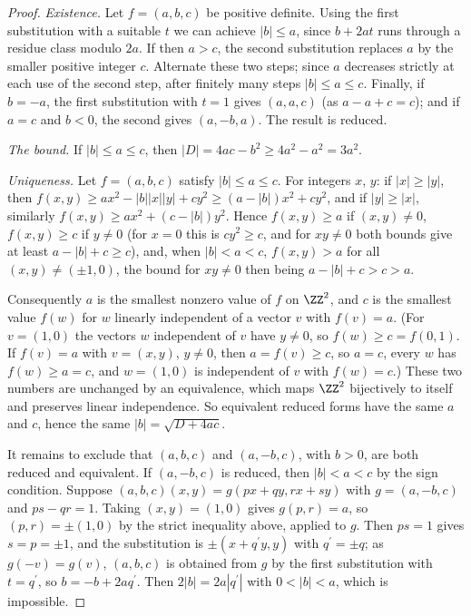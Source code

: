 \begin{proof}
\emph{Existence.} Let $f = (a, b, c)$ be positive definite. Using the first substitution with a suitable $t$ we can achieve $|b| \leq a$, since $b + 2at$ runs through a residue class modulo $2a$. If
then $a > c$, the second substitution replaces $a$ by the smaller positive integer $c$. Alternate these two steps; since $a$ decreases strictly at each use of the second step, after finitely many steps
$|b| \leq a \leq c$. Finally, if $b = -a$, the first substitution with $t = 1$ gives $(a, a, c)$ (as $a - a + c = c$); and if $a = c$ and $b < 0$, the second gives $(a, -b, a)$. The result is reduced.

\emph{The bound.} If $|b| \leq a \leq c$, then $|D| = 4ac - b^2 \geq 4a^2 - a^2 = 3a^2$.

\emph{Uniqueness.} Let $f = (a, b, c)$ satisfy $|b| \leq a \leq c$. For integers $x$, $y$: if $|x| \geq |y|$, then
$f(x, y) \geq ax^2 - |b||x||y| + cy^2 \geq (a - |b|)x^2 + cy^2$, and if $|y| \geq |x|$, similarly $f(x, y) \geq ax^2 + (c - |b|)y^2$. Hence $f(x, y) \geq a$ if $(x, y) \neq 0$, $f(x, y) \geq c$ if $y \neq 0$
(for $x = 0$ this is $cy^2 \geq c$, and for $xy \neq 0$ both bounds give at least $a - |b| + c \geq c$), and, when $|b| < a < c$, $f(x, y) > a$ for all $(x, y) \neq (\pm1, 0)$, the bound for $xy \neq 0$ then
being $a - |b| + c > c > a$.

Consequently $a$ is the smallest nonzero value of $f$ on $\ZZ^2$, and $c$ is the smallest value $f(w)$ for $w$ linearly independent of a vector $v$ with $f(v) = a$. (For $v = (1, 0)$ the vectors $w$ independent
of $v$ have $y \neq 0$, so $f(w) \geq c = f(0, 1)$. If $f(v) = a$ with $v = (x, y)$, $y \neq 0$, then $a = f(v) \geq c$, so $a = c$, every $w$ has $f(w) \geq a = c$, and $w = (1, 0)$ is independent of $v$ with $f(w) = c$.) These two numbers are unchanged by an
equivalence, which maps $\ZZ^2$ bijectively to itself and preserves linear independence. So equivalent reduced forms have the same $a$ and $c$, hence the same $|b| = \sqrt{D + 4ac}$.

It remains to exclude that $(a, b, c)$ and $(a, -b, c)$, with $b > 0$, are both reduced and equivalent. If $(a, -b, c)$ is reduced, then $|b| < a < c$ by the sign condition. Suppose
$(a, b, c)(x, y) = g(px + qy, rx + sy)$ with $g = (a, -b, c)$ and $ps - qr = 1$. Taking $(x, y) = (1, 0)$ gives $g(p, r) = a$, so $(p, r) = \pm(1, 0)$ by the strict inequality above, applied to $g$. Then
$ps = 1$ gives $s = p = \pm1$, and the substitution is $\pm(x + q^{\prime}y, y)$ with $q^{\prime} = \pm q$; as $g(-v) = g(v)$, $(a, b, c)$ is obtained from $g$ by the first substitution with $t = q^{\prime}$, so
$b = -b + 2aq^{\prime}$. Then $2|b| = 2a|q^{\prime}|$ with $0 < |b| < a$, which is impossible.
\end{proof}

